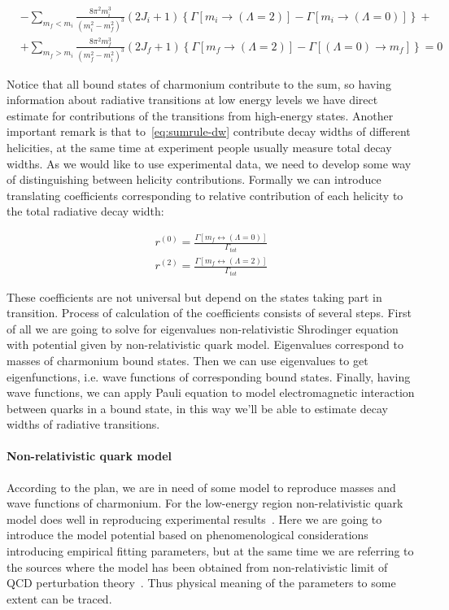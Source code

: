 \begin{align} \label{eq:sumrule-dw}
    &-\sum_{m_f < m_i} \frac{8 \pi^2 m_i^3}{(m_i^2 - m_f^2)^3} (2J_i+1) \left\{\Gamma\left[m_i \rightarrow (\Lambda = 2)\right] - \Gamma\left[m_i \rightarrow (\Lambda = 0)\right] \right\} + \nonumber \\
    &+ \sum_{m_f > m_i} \frac{8 \pi^2 m_f^3}{(m_f^2 - m_i^2)^3} (2J_f+1) \left\{\Gamma\left[m_f \rightarrow (\Lambda = 2)\right] - \Gamma\left[(\Lambda = 0) \rightarrow m_f\right] \right\} = 0
\end{align}

Notice that all bound states of charmonium contribute to the sum, so having information about radiative transitions at low energy levels we have direct estimate for contributions of the transitions from high-energy states. Another important remark is that to~\ref{eq:sumrule-dw} contribute decay widths of different helicities, at the same time at experiment people usually measure total decay widths. As we would like to use experimental data, we need to develop some way of distinguishing between helicity contributions. Formally we can introduce translating coefficients corresponding to relative contribution of each helicity to the total radiative decay width:

\begin{align}
    r^{(0)} = \frac{\Gamma\left[m_f \leftrightarrow (\Lambda=0)\right]}{\Gamma_{tot}} \\
    r^{(2)} = \frac{\Gamma\left[m_f \leftrightarrow (\Lambda=2)\right]}{\Gamma_{tot}}
\end{align}

These coefficients are not universal but depend on the states taking part in transition. Process of calculation of the coefficients consists of several steps. First of all we are going to solve for eigenvalues non-relativistic Shrodinger equation with potential given by non-relativistic quark model. Eigenvalues correspond to masses of charmonium bound states. Then we can use eigenvalues to get eigenfunctions, i.e. wave functions of corresponding bound states. Finally, having wave functions, we can apply Pauli equation to model electromagnetic interaction between quarks in a bound state, in this way we'll be able to estimate decay widths of radiative transitions.

\paragraph{Non-relativistic quark model}
According to the plan, we are in need of some model to reproduce masses and wave functions of charmonium. For the low-energy region non-relativistic quark model does well in reproducing experimental results~\cite{deng-charm, deng-bot}. Here we are going to introduce the model potential based on phenomenological considerations introducing empirical fitting parameters, but at the same time we are referring to the sources where the model has been obtained from non-relativistic limit of QCD perturbation theory~\cite{nrqm-perturb}. Thus physical meaning of the parameters to some extent can be traced.

